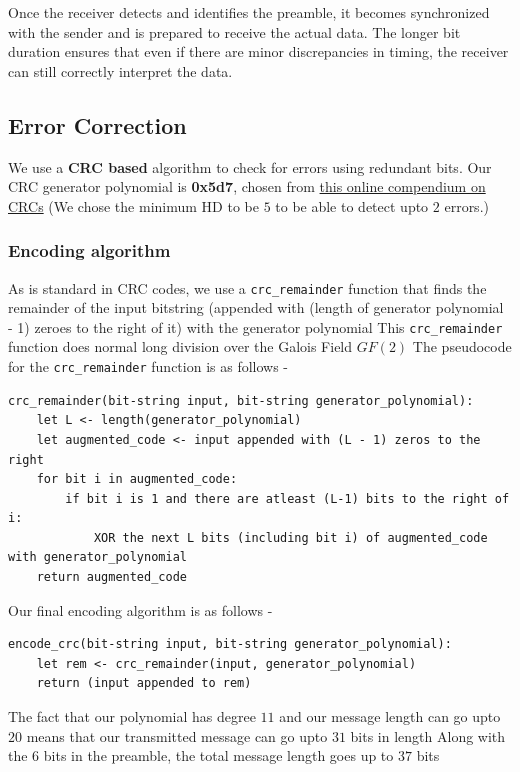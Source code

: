 \documentclass[a4paper,12pt]{article}
\begin{document}
Once the receiver detects and identifies the preamble, it becomes synchronized with the sender and is prepared to receive the actual data. The longer bit duration ensures that even if there are minor discrepancies in timing, the receiver can still correctly interpret the data. 

\subsection{Error Correction}
We use a \textbf{CRC based} algorithm to check for errors using redundant bits. Our CRC generator polynomial is \textbf{0x5d7}, chosen from \href{https://users.ece.cmu.edu/~koopman/crc/index.html}{this online compendium on CRCs} (We chose the minimum HD to be $5$ to be able to detect upto $2$ errors.)
\subsubsection{Encoding algorithm}
As is standard in CRC codes, we use a \verb|crc_remainder|  function that finds the remainder of the input bitstring (appended with (length of generator polynomial - 1) zeroes to the right of it) with the generator polynomial
\newline This \verb|crc_remainder| function does normal long division over the Galois Field $GF(2)$
\newline The pseudocode for the \verb|crc_remainder| function is as follows - 
\begin{verbatim}
crc_remainder(bit-string input, bit-string generator_polynomial):
    let L <- length(generator_polynomial)
    let augmented_code <- input appended with (L - 1) zeros to the right
    for bit i in augmented_code:
        if bit i is 1 and there are atleast (L-1) bits to the right of i:
            XOR the next L bits (including bit i) of augmented_code with generator_polynomial
    return augmented_code 
\end{verbatim}
Our final encoding algorithm is as follows - 
\begin{verbatim}
encode_crc(bit-string input, bit-string generator_polynomial):
    let rem <- crc_remainder(input, generator_polynomial)
    return (input appended to rem)
\end{verbatim}
The fact that our polynomial has degree $11$ and our message length can go upto $20$ means that our transmitted message can go upto $31$ bits in length
\newline Along with the $6$ bits in the preamble, the total message length goes up to $37$ bits
\end{document}
